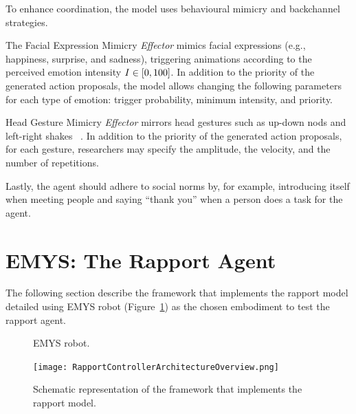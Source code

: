 To enhance coordination, the model uses behavioural mimicry and backchannel strategies.

The Facial Expression Mimicry \textit{Effector} mimics facial expressions (e.g., happiness, surprise, and sadness), triggering animations according to the perceived emotion intensity $I \in \interval{0}{100}$. In addition to the priority of the generated action proposals, the model allows changing the following parameters for each type of emotion: trigger probability, minimum intensity, and priority.

Head Gesture Mimicry \textit{Effector} mirrors head gestures such as up-down nods and left-right shakes ~\cite{Riek2009, Andrist2014, Cassell2007, Wang2009}. In addition to the priority of the generated action proposals, for each gesture, researchers may specify the amplitude, the velocity, and the number of repetitions.

Lastly, the agent should adhere to social norms by, for example, introducing itself when meeting people and saying ``thank you'' when a person does a task for the agent.


\section{\ac{EMYS}: The Rapport Agent}
\label{sec:model_implementation}

The following section describe the framework that implements the rapport model detailed using \acf{EMYS} robot (Figure~\ref{fig:robots:EMYS2}) as the chosen embodiment to test the rapport agent.

\begin{figure}[H]
	\centering
	\caption{\ac{EMYS} robot.}
	\label{fig:robots:EMYS2}
\end{figure}

\begin{figure}[H]
	\centering
	\texttt{[image: RapportControllerArchitectureOverview.png]}
	\caption{Schematic representation of the framework that implements the rapport model.}
	\label{fig:rapport:archicture}
\end{figure}

